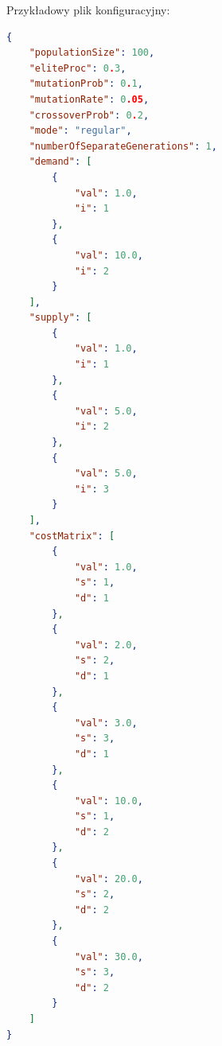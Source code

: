 Przykładowy plik konfiguracyjny:

\begin{lstlisting}[language=json, firstnumber=1, frame=single]
{
    "populationSize": 100,
    "eliteProc": 0.3,
    "mutationProb": 0.1,
    "mutationRate": 0.05,
    "crossoverProb": 0.2,
    "mode": "regular",
    "numberOfSeparateGenerations": 1,
    "demand": [
        {
            "val": 1.0,
            "i": 1
        },
        {
            "val": 10.0,
            "i": 2
        }
    ],
    "supply": [
        {
            "val": 1.0,
            "i": 1
        },
        {
            "val": 5.0,
            "i": 2
        },
        {
            "val": 5.0,
            "i": 3
        }
    ],
    "costMatrix": [
        {
            "val": 1.0,
            "s": 1,
            "d": 1
        },
        {
            "val": 2.0,
            "s": 2,
            "d": 1
        },
        {
            "val": 3.0,
            "s": 3,
            "d": 1
        },
        {
            "val": 10.0,
            "s": 1,
            "d": 2
        },
        {
            "val": 20.0,
            "s": 2,
            "d": 2
        },
        {
            "val": 30.0,
            "s": 3,
            "d": 2
        }
    ]
}
\end{lstlisting}